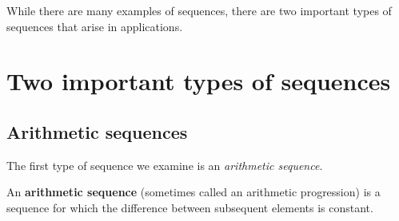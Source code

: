 \documentclass{ximera}
\begin{document}
While there are many examples of sequences, there are two important types of sequences that arise in applications.

\section{Two important types of sequences}

\subsection{Arithmetic sequences}

The first type of sequence we examine is an \emph{arithmetic sequence}.  

\begin{definition}
  An \textbf{arithmetic sequence} (sometimes called an arithmetic
  progression) is a sequence for which the
  difference between subsequent elements is constant.
\end{definition}
\end{document}
